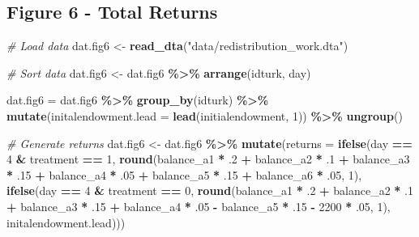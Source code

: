 \documentclass[
]{article}
\newenvironment{Shaded}{\begin{snugshade}}{\end{snugshade}}
\newcommand{\AttributeTok}[1]{\textcolor[rgb]{0.13,0.29,0.53}{#1}}
\newcommand{\CommentTok}[1]{\textcolor[rgb]{0.56,0.35,0.01}{\textit{#1}}}
\newcommand{\DecValTok}[1]{\textcolor[rgb]{0.00,0.00,0.81}{#1}}
\newcommand{\FunctionTok}[1]{\textcolor[rgb]{0.13,0.29,0.53}{\textbf{#1}}}
\newcommand{\NormalTok}[1]{#1}
\newcommand{\OtherTok}[1]{\textcolor[rgb]{0.56,0.35,0.01}{#1}}
\newcommand{\SpecialCharTok}[1]{\textcolor[rgb]{0.81,0.36,0.00}{\textbf{#1}}}
\newcommand{\StringTok}[1]{\textcolor[rgb]{0.31,0.60,0.02}{#1}}
\begin{document}
\subsection{Figure 6 - Total Returns}\label{figure-6---total-returns}

\begin{Shaded}
\begin{Highlighting}[]
\CommentTok{\# Load data}
\NormalTok{dat.fig6 }\OtherTok{\textless{}{-}} \FunctionTok{read\_dta}\NormalTok{(}\StringTok{"data/redistribution\_work.dta"}\NormalTok{)}

\CommentTok{\# Sort data}
\NormalTok{dat.fig6 }\OtherTok{\textless{}{-}}\NormalTok{ dat.fig6 }\SpecialCharTok{\%\textgreater{}\%}
  \FunctionTok{arrange}\NormalTok{(idturk, day)}

\NormalTok{dat.fig6 }\OtherTok{=}\NormalTok{ dat.fig6 }\SpecialCharTok{\%\textgreater{}\%}
  \FunctionTok{group\_by}\NormalTok{(idturk) }\SpecialCharTok{\%\textgreater{}\%}
  \FunctionTok{mutate}\NormalTok{(}\AttributeTok{initalendowment.lead =} \FunctionTok{lead}\NormalTok{(initialendowment, }\DecValTok{1}\NormalTok{)) }\SpecialCharTok{\%\textgreater{}\%}
  \FunctionTok{ungroup}\NormalTok{()}

\CommentTok{\# Generate returns}
\NormalTok{dat.fig6 }\OtherTok{\textless{}{-}}\NormalTok{ dat.fig6 }\SpecialCharTok{\%\textgreater{}\%}
  \FunctionTok{mutate}\NormalTok{(}\AttributeTok{returns =} \FunctionTok{ifelse}\NormalTok{(day }\SpecialCharTok{==} \DecValTok{4} \SpecialCharTok{\&}\NormalTok{ treatment }\SpecialCharTok{==} \DecValTok{1}\NormalTok{,}
                          \FunctionTok{round}\NormalTok{(balance\_a1 }\SpecialCharTok{*}\NormalTok{ .}\DecValTok{2} \SpecialCharTok{+}\NormalTok{ balance\_a2 }\SpecialCharTok{*}\NormalTok{ .}\DecValTok{1} \SpecialCharTok{+}\NormalTok{ balance\_a3 }\SpecialCharTok{*}\NormalTok{ .}\DecValTok{15} \SpecialCharTok{+}\NormalTok{ balance\_a4 }\SpecialCharTok{*}\NormalTok{ .}\DecValTok{05} \SpecialCharTok{+}\NormalTok{ balance\_a5 }\SpecialCharTok{*}\NormalTok{ .}\DecValTok{15} \SpecialCharTok{+}\NormalTok{ balance\_a6 }\SpecialCharTok{*}\NormalTok{ .}\DecValTok{05}\NormalTok{, }\DecValTok{1}\NormalTok{), }
                          \FunctionTok{ifelse}\NormalTok{(day }\SpecialCharTok{==} \DecValTok{4} \SpecialCharTok{\&}\NormalTok{ treatment }\SpecialCharTok{==} \DecValTok{0}\NormalTok{,}
                                 \FunctionTok{round}\NormalTok{(balance\_a1 }\SpecialCharTok{*}\NormalTok{ .}\DecValTok{2} \SpecialCharTok{+}\NormalTok{ balance\_a2 }\SpecialCharTok{*}\NormalTok{ .}\DecValTok{1} \SpecialCharTok{+}\NormalTok{ balance\_a3 }\SpecialCharTok{*}\NormalTok{ .}\DecValTok{15} \SpecialCharTok{+}\NormalTok{ balance\_a4 }\SpecialCharTok{*}\NormalTok{ .}\DecValTok{05} \SpecialCharTok{{-}}\NormalTok{ balance\_a5 }\SpecialCharTok{*}\NormalTok{ .}\DecValTok{15} \SpecialCharTok{{-}} \DecValTok{2200} \SpecialCharTok{*}\NormalTok{ .}\DecValTok{05}\NormalTok{, }\DecValTok{1}\NormalTok{),}
\NormalTok{                                 initalendowment.lead)))}


\end{Highlighting}
\end{Shaded}
\end{document}
